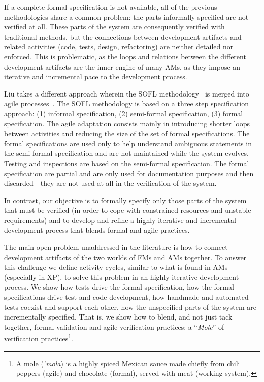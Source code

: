 \documentclass[english]{lni}
\newcommand{\mole}{``\emph{Mole}''\xspace}
\begin{document}
If a complete formal specification is not available, all of the
previous methodologies share a common problem: the parts informally
specified are not verified at all.  These parts of the system are
consequently verified with traditional methods, but the connections
between development artifacts and related activities (code, tests,
design, refactoring) are neither detailed nor enforced.  This is
problematic, as the loops and relations between the different
development artifacts are the inner engine of many AMs, as they impose
an iterative and incremental pace to the development process.

Liu takes a different approach wherein the SOFL
methodology~\cite{Liu2004} is merged into agile
processes~\cite{Liu2010}.  The SOFL methodology is based on a three
step specification approach: (1) informal specification, (2)
semi-formal specification, (3) formal specification.  The agile
adaptation consists mainly in introducing shorter loops between
activities and reducing the size of the set of formal specifications.
The formal specifications are used only to help understand ambiguous
statements in the semi-formal specification and are not maintained
while the system evolves.  Testing and inspections are based on the
semi-formal specification.  The formal specification are partial and
are only used for documentation purposes and then discarded---they are
not used at all in the verification of the system.

In contrast, our objective is to formally specify only those parts of
the system that must be verified (in order to cope with constrained
resources and unstable requirements) and to develop and refine a
highly iterative and incremental development process that blends
formal and agile practices.

The main open problem unaddressed in the literature is how to connect
development artifacts of the two worlds of FMs and AMs together.  To
answer this challenge we define activity cycles, similar to what is
found in AMs (especially in XP), to solve this problem in an highly
iterative development process.  We show how tests drive the formal
specification, how the formal specifications drive test and code
development, how handmade and automated tests coexist and support each
other, how the unspecified parts of the system are incrementally
specified.  That is, we show how to blend, and not just tack together,
formal validation and agile verification practices: a \mole of
verification practices\footnote{A mole (\emph{'m\=ol\=a}) is a highly
  spiced Mexican sauce made chiefly from chili peppers (agile) and
  chocolate (formal), served with meat (working system).}.
\end{document}
